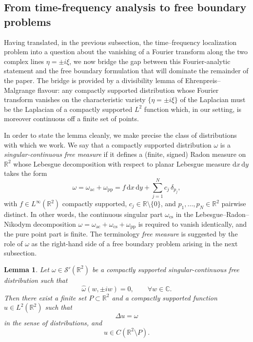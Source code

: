\documentclass[a4paper,11pt,reqno]{amsart}
\numberwithin{equation}{section}
\theoremstyle{plain} %
\newtheorem{lemma}{Lemma}[section]
\theoremstyle{definition} %
\theoremstyle{remark}
\newcommand{\R}{\mathbb{R}}
\newcommand{\C}{\mathbb{C}}
\begin{document}
\subsection{From time-frequency analysis to free boundary problems}\label{sec:fourier-to-fboundary}

Having translated, in the previous subsection, the time--frequency
localization problem into a question about the vanishing of a Fourier
transform along the two complex lines $\eta=\pm i\xi$, we now bridge the gap
between this Fourier-analytic statement and the free boundary formulation
that will dominate the remainder of the paper. The bridge is provided by a
divisibility lemma of Ehrenpreis--Malgrange flavour: any compactly supported
distribution whose Fourier transform vanishes on the characteristic variety
$\{\eta=\pm i\xi\}$ of the Laplacian must be the Laplacian of a compactly
supported $L^2$ function which, in our setting, is moreover continuous off a
finite set of points.

In order to state the lemma cleanly, we make precise the class of
distributions with which we work. We say that a compactly supported
distribution $\omega$ is a \emph{singular-continuous free measure} if it
defines a (finite, signed) Radon measure on $\R^2$ whose Lebesgue
decomposition with respect to planar Lebesgue measure $\mathrm{d}x\,
\mathrm{d}y$ takes the form
\[
\omega = \omega_{\mathrm{ac}} + \omega_{\mathrm{pp}}
       = f\,\mathrm{d}x\,\mathrm{d}y + \sum_{j=1}^N c_j\,\delta_{p_j},
\]
with \(f\in L^\infty(\R^2)\) compactly supported, \(c_j\in \R\setminus\{0\}\), and
$p_1,\ldots,p_N\in \R^2$ pairwise distinct. In other words, the continuous
singular part $\omega_{\mathrm{cs}}$ in the Lebesgue--Radon--Nikodym
decomposition $\omega=\omega_{\mathrm{ac}}+\omega_{\mathrm{cs}}+
\omega_{\mathrm{pp}}$ is required to vanish identically, and the pure
point part is finite. The terminology \emph{free measure} is suggested by
the role of $\omega$ as the right-hand side of a free boundary problem
arising in the next subsection.

\begin{lemma}\label{lemma:fourier-to-fboundary}
Let $\omega\in \mathcal{S}'(\R^2)$ be a compactly supported singular-continuous
free distribution such that
\[
\widehat{\omega}(w,\pm iw)=0,\qquad \forall w\in\C.
\]
Then there exist a finite set $P\subset \R^2$ and a compactly supported
function $u\in L^2(\R^2)$ such that
\[
\Delta u=\omega
\]
in the sense of distributions, and
\[
u\in C(\R^2\setminus P).
\]
\end{lemma}
\end{document}

